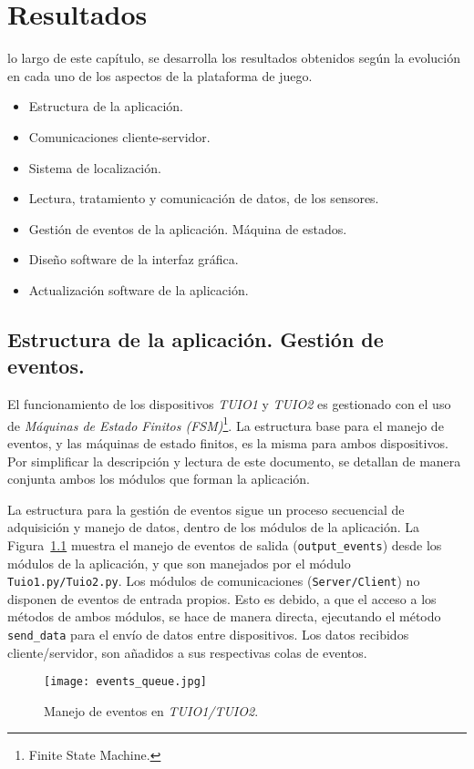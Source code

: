 \chapter{Resultados}
\label{chap:resultados}


 lo largo de este capítulo, se desarrolla los resultados obtenidos según la evolución en cada uno de los aspectos de la plataforma de juego.
\begin{itemize}
\item Estructura de la aplicación.
\item Comunicaciones cliente-servidor.
\item Sistema de localización.
\item Lectura, tratamiento y comunicación de datos, de los sensores.
\item Gestión de eventos de la aplicación. Máquina de estados.
\item Diseño software de la interfaz gráfica.
\item Actualización software de la aplicación.
\end{itemize}


\section{Estructura de la aplicación. Gestión de eventos.}
El funcionamiento de los dispositivos \emph{TUIO1} y \emph{TUIO2} es gestionado con el uso de \emph{Máquinas de Estado Finitos (FSM)}\footnote{Finite State Machine.}.
La estructura base para el manejo de eventos, y las máquinas de estado finitos, es la misma para ambos dispositivos. Por simplificar la descripción y lectura de este documento, se detallan de manera conjunta ambos los módulos que forman la aplicación.

La estructura para la gestión de eventos sigue un proceso secuencial de adquisición y manejo de datos, dentro de los módulos de la aplicación. La Figura~\ref{fig:eventosqueue} muestra el manejo de eventos de salida (\texttt{output\_events}) desde los módulos de la aplicación, y que son manejados por el módulo \texttt{Tuio1.py/Tuio2.py}. Los módulos de comunicaciones (\texttt{Server/Client}) no disponen de eventos de entrada propios. Esto es debido, a que el acceso a los métodos de ambos módulos, se hace de manera directa, ejecutando el método \texttt{send\_data} para el envío de datos entre dispositivos. Los datos recibidos cliente/servidor, son añadidos a sus respectivas colas de eventos.

\begin{figure}[!h]
\begin{center}
\texttt{[image: events\_queue.jpg]}
\caption{Manejo de eventos en \emph{TUIO1/TUIO2}.}
\label{fig:eventosqueue}
\end{center}
\end{figure}


